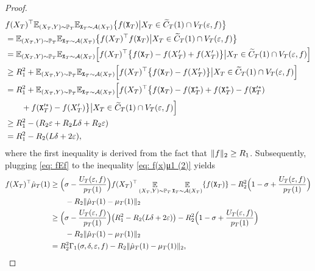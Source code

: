 \begin{proof}
\begin{align}
\label{eq: fEf}
&f(X_T)^{\top}\mathbb{E}_{(X_T ,Y) \sim \mathbb{P}_T}\mathbb{E}_{\mathtt{X}_T \sim \mathcal{A}(X_T)}\big\{f(\mathtt{X}_T) \big\vert X_T \in \widetilde{C}_T(1) \cap V_T(\varepsilon, f)\big\} \nonumber \\
&= \mathbb{E}_{(X_T ,Y) \sim \mathbb{P}_T}\mathbb{E}_{\mathtt{X}_T \sim \mathcal{A}(X_T)}\big\{f(X_T)^\top f(\mathtt{X}_T)\big\vert X_T \in \widetilde{C}_T(1) \cap V_T(\varepsilon, f)\big\} \nonumber \\
&= \mathbb{E}_{(X_T ,Y) \sim \mathbb{P}_T}\mathbb{E}_{\mathtt{X}_T \sim \mathcal{A}(X_T)}\Big[f(X_T)^\top\big\{f(\mathtt{X}_T) - f(X_T^\prime) + f(X_T^\prime)\big\} \big\vert X_T \in \widetilde{C}_T(1) \cap V_T(\varepsilon, f)\Big] \nonumber \\
&\geq R_1^2 + \mathbb{E}_{(X_T ,Y) \sim \mathbb{P}_T}\mathbb{E}_{\mathtt{X}_T \sim \mathcal{A}(X_T)}\Big[f(X_T)^\top\big\{f(\mathtt{X}_T) - f(X_T^\prime)\big\} \big\vert X_T \in \widetilde{C}_T(1) \cap V_T(\varepsilon, f)\Big] \nonumber \\
&= R_1^2 + \mathbb{E}_{(X_T ,Y) \sim \mathbb{P}_T}\mathbb{E}_{\mathtt{X}_T \sim \mathcal{A}(X_T)}\Big[f(X_T)^\top\big\{f(\mathtt{X}_T) - f(\mathtt{X}_T^*) + f(\mathtt{X}_T^*) - f(\mathtt{X}_T^{\prime*}) \nonumber \\
&\qquad +  f(\mathtt{X}_T^{\prime*}) - f(X_T^\prime)\big\} \big\vert X_T \in \widetilde{C}_T(1) \cap V_T(\varepsilon, f)\Big] \nonumber \\
&\geq R_1^2 - (R_2\varepsilon + R_2L\delta + R_2\varepsilon) \nonumber \\
&= R_1^2 - R_2(L\delta + 2\varepsilon),
\end{align}
where the first inequality is derived from the fact that $\Vert{f}\Vert_2 \geq R_1$. Subsequently, plugging \eqref{eq: fEf} to the inequality \eqref{eq: f(x)μ1 (2)} yields
\begin{align}\label{eq: f(x)μ1 ≥ Γ}
f(X_T)^{\top}\hat{\mu}_T(1) &\geq \Big(\sigma - \frac{U_T(\eps, f)}{p_T(1)}\Big)f(X_T)^{\top}\mathop{\E}\limits_{(X_T ,Y) \sim \P_T}\mathop{\E}\limits_{\mathtt{X}_T \sim \mathcal{A}(X_T)}\{f(\mathtt{X}_T)\} - R_2^2\Big(1 - \sigma + \frac{U_T(\eps, f)}{p_T(1)}\Big)  \nonumber \\
&\qquad - R_2\norm{\hat{\mu}_T(1) - \mu_T(1)}_2 \nonumber\\
&\geq \Big(\sigma - \frac{U_T(\eps, f)}{p_T(1)}\Big)\big(R_1^2 - R_2(L\delta + 2\eps)\big) - R_2^2\Big(1 - \sigma + \frac{U_T(\eps, f)}{p_T(1)}\Big) \nonumber\\
&\qquad - R_2\norm{\hat{\mu}_T(1) - \mu_T(1)}_2 \nonumber\\
&= R_2^2\Gamma_1(\sigma, \delta, \eps, f) - R_2\norm{\hat{\mu}_T(1) - \mu_T(1)}_2,

\end{align}
\end{proof}
